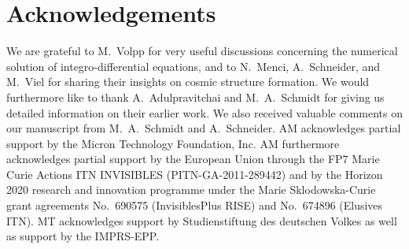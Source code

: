 \documentclass[12pt]{article}
\begin{document}
\section*{Acknowledgements}
We are grateful to M.~Volpp for very useful discussions concerning the numerical solution of integro-differential equations, and to N.~Menci, A.~Schneider, and M.~Viel for sharing their insights on cosmic structure formation. We would furthermore like to thank A.~Adulpravitchai and M.~A.~Schmidt for giving us detailed information on their earlier work. We also received valuable comments on our manuscript from M.~A.~Schmidt and A.~Schneider. AM acknowledges partial support by the Micron Technology Foundation, Inc. AM furthermore acknowledges partial support by the European Union through the FP7 Marie Curie Actions ITN INVISIBLES (PITN-GA-2011-289442) and by the Horizon 2020 research and innovation programme under the Marie Sklodowska-Curie grant agreements No.~690575 (InvisiblesPlus RISE) and No.~674896 (Elusives ITN). MT acknowledges support by Studienstiftung des deutschen Volkes as well as support by the IMPRS-EPP.
\begin{appendices}




\end{appendices}




\end{document}
